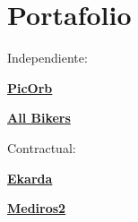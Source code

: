 \section{Portafolio}
%
Independiente:

\begin{innerlist}
\item \href{http://www.picorb.com/}{\textbf{PicOrb}}
\item \href{http://www.allbikers.net/}{\textbf{All Bikers}}
\end{innerlist}
\quarterblankline

Contractual:

\begin{innerlist}
\item \href{https://my.ekarda.com/}{\textbf{Ekarda}}
\item \href{http://demo.100grados.co:8080/desempeno100/}{\textbf{Mediros2}}
\end{innerlist}

